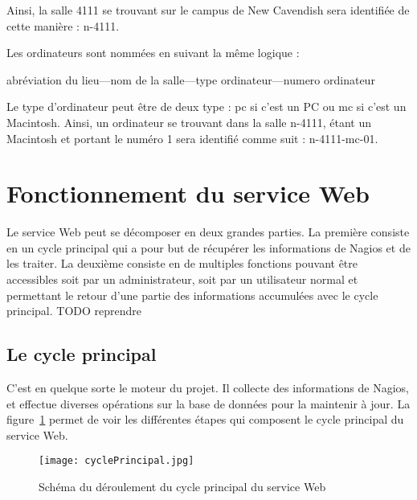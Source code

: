 Ainsi, la salle \textsf{4111} se trouvant sur le campus de New Cavendish sera identifi\'ee de cette mani\`ere : \textsf{n-4111}.

\noindent Les ordinateurs sont nomm\'ees en suivant la m\^eme logique :

\begin{center}
	\textsf{abr\'eviation du lieu---nom de la salle---type ordinateur---numero ordinateur}
	
\end{center}

Le type d'ordinateur peut \^etre de deux type : \textsf{pc} si c'est un PC ou \textsf{mc} si c'est un Macintosh.
Ainsi, un ordinateur se trouvant dans la salle \textsf{n-4111}, \'etant un Macintosh et portant le num\'ero 1 sera identifi\'e comme suit : \textsf{n-4111-mc-01}.



\section{Fonctionnement du service Web}

Le service Web peut se d\'ecomposer en deux grandes parties.
La premi\`ere consiste en un cycle principal qui a pour but de r\'ecup\'erer les informations de Nagios et de les traiter.
La deuxi\`eme consiste en de multiples fonctions pouvant \^etre accessibles soit par un administrateur, soit par un utilisateur normal et permettant le retour d'une partie des informations accumul\'ees avec le cycle principal.
TODO reprendre

\subsection{Le cycle principal}
\label{section:cyclePrincipal}

C'est en quelque sorte le moteur du projet.
Il collecte des informations de Nagios, et effectue diverses op\'erations sur la base de donn\'ees pour la maintenir \`a jour.
La figure~\ref{figure:cyclePrincipal} permet de voir les diff\'erentes \'etapes qui composent le cycle principal du service Web.

\begin{figure}[!ht]
	\centering
	\texttt{[image: cyclePrincipal.jpg]}
	\caption{Sch\'ema du d\'eroulement du cycle principal du service Web}
	\label{figure:cyclePrincipal}
	
\end{figure}

